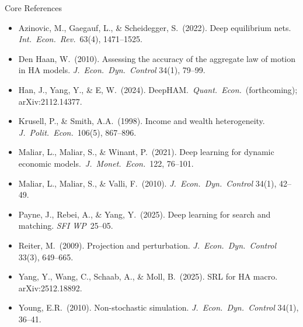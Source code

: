 \documentclass[aspectratio=169,11pt]{beamer}
\newcommand{\emphc}[1]{\textcolor{harvardcrimson}{#1}}
\begin{document}
\begin{frame}{Core References}
{\scriptsize
\begin{itemize}\itemsep0pt
    \item Azinovic, M., Gaegauf, L., \& Scheidegger, S.\ (2022). Deep equilibrium nets. \emph{Int.\ Econ.\ Rev.}\ 63(4), 1471--1525.
    \item Den Haan, W.\ (2010). Assessing the accuracy of the aggregate law of motion in HA models. \emph{J.\ Econ.\ Dyn.\ Control} 34(1), 79--99.
    \item \emphc{Han, J., Yang, Y., \& E, W.\ (2024). DeepHAM.}\ \emph{Quant.\ Econ.}\ (forthcoming); arXiv:2112.14377.
    \item Krusell, P., \& Smith, A.A.\ (1998). Income and wealth heterogeneity. \emph{J.\ Polit.\ Econ.}\ 106(5), 867--896.
    \item \emphc{Maliar, L., Maliar, S., \& Winant, P.\ (2021). Deep learning for dynamic economic models.}\ \emph{J.\ Monet.\ Econ.}\ 122, 76--101.
    \item Maliar, L., Maliar, S., \& Valli, F.\ (2010). \emph{J.\ Econ.\ Dyn.\ Control} 34(1), 42--49.
    \item Payne, J., Rebei, A., \& Yang, Y.\ (2025). Deep learning for search and matching. \emph{SFI WP}\ 25--05.
    \item Reiter, M.\ (2009). Projection and perturbation. \emph{J.\ Econ.\ Dyn.\ Control} 33(3), 649--665.
    \item Yang, Y., Wang, C., Schaab, A., \& Moll, B.\ (2025). SRL for HA macro. arXiv:2512.18892.
    \item Young, E.R.\ (2010). Non-stochastic simulation. \emph{J.\ Econ.\ Dyn.\ Control} 34(1), 36--41.
\end{itemize}
}
\end{frame}
\end{document}

